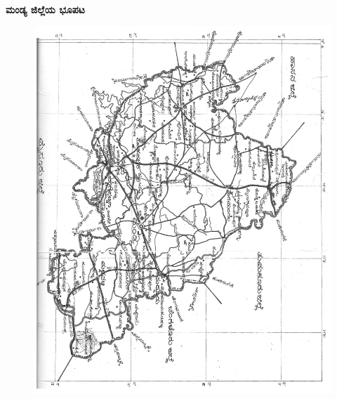 ~\phantom{a}

\vfill

\thispagestyle{empty}

\centerline{\large\bf ಮಂಡ್ಯ ಜಿಲ್ಲೆಯ ಭೂಪಟ}

\begin{figure}[H]
\centering
\includegraphics[scale=1.05]{images/Mandya.jpg}
\end{figure}

\vfill\eject

~\phantom{a}

\vfill

\thispagestyle{empty}

\begin{figure}[H]
\centering
{}
\end{figure}

\vfill

